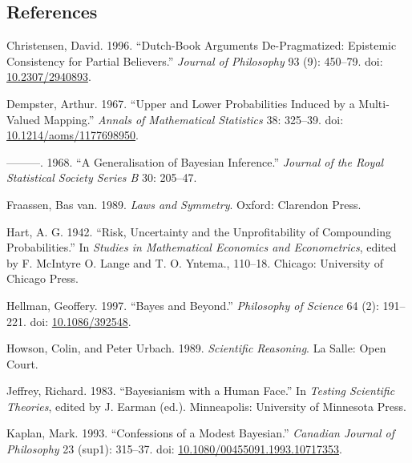 \documentclass[
  11pt,
  letterpaper,
  DIV=11,
  numbers=noendperiod,
  twoside]{scrartcl}
\newlength{\cslhangindent}
\newenvironment{CSLReferences}[2] %
 {\begin{list}{}{%
  \setlength{\itemindent}{0pt}
  \setlength{\leftmargin}{0pt}
  \setlength{\parsep}{0pt}
  \ifodd #1
   \setlength{\leftmargin}{\cslhangindent}
   \setlength{\itemindent}{-1\cslhangindent}
  \fi
  \setlength{\itemsep}{#2\baselineskip}}}
 {\end{list}}
\begin{document}
\subsection*{References}\label{references}

\label{refs}
\begin{CSLReferences}{1}{0}
Christensen, David. 1996. {``Dutch-Book Arguments {D}e-Pragmatized:
Epistemic Consistency for Partial Believers.''} \emph{Journal of
Philosophy} 93 (9): 450--79. doi:
\href{https://doi.org/10.2307/2940893}{10.2307/2940893}.

Dempster, Arthur. 1967. {``Upper and Lower Probabilities Induced by a
Multi-Valued Mapping.''} \emph{Annals of Mathematical Statistics} 38:
325--39. doi:
\href{https://doi.org/10.1214/aoms/1177698950}{10.1214/aoms/1177698950}.

---------. 1968. {``A Generalisation of Bayesian Inference.''}
\emph{Journal of the Royal Statistical Society Series B} 30: 205--47.

Fraassen, Bas van. 1989. \emph{Laws and Symmetry}. Oxford: Clarendon
Press.

Hart, A. G. 1942. {``Risk, Uncertainty and the Unprofitability of
Compounding Probabilities.''} In \emph{Studies in Mathematical Economics
and Econometrics}, edited by F. McIntyre O. Lange and T. O. Yntema.,
110--18. Chicago: University of Chicago Press.

Hellman, Geoffery. 1997. {``Bayes and Beyond.''} \emph{Philosophy of
Science} 64 (2): 191--221. doi:
\href{https://doi.org/10.1086/392548}{10.1086/392548}.

Howson, Colin, and Peter Urbach. 1989. \emph{Scientific Reasoning}. La
Salle: Open Court.

Jeffrey, Richard. 1983. {``Bayesianism with a Human Face.''} In
\emph{Testing Scientific Theories}, edited by J. Earman (ed.).
Minneapolis: University of Minnesota Press.

Kaplan, Mark. 1993. {``Confessions of a Modest Bayesian.''}
\emph{Canadian Journal of Philosophy} 23 (sup1): 315--37. doi:
\href{https://doi.org/10.1080/00455091.1993.10717353}{10.1080/00455091.1993.10717353}.


\end{CSLReferences}
\end{document}
